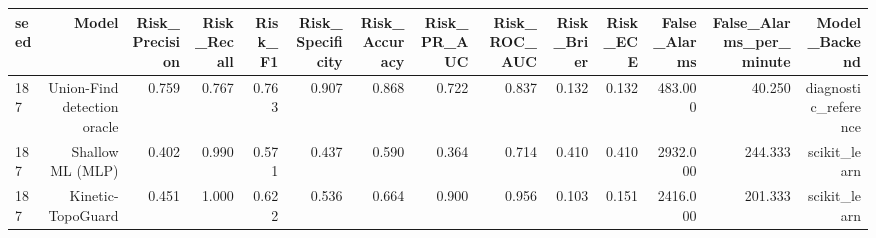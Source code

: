 \begin{tabular}{lrrrrrrrrrrrrr}
\toprule
seed & Model & Risk\_Precision & Risk\_Recall & Risk\_F1 & Risk\_Specificity & Risk\_Accuracy & Risk\_PR\_AUC & Risk\_ROC\_AUC & Risk\_Brier & Risk\_ECE & False\_Alarms & False\_Alarms\_per\_minute & Model\_Backend \\
\midrule
187 & Union-Find detection oracle & 0.759 & 0.767 & 0.763 & 0.907 & 0.868 & 0.722 & 0.837 & 0.132 & 0.132 & 483.000 & 40.250 & diagnostic\_reference \\
187 & Shallow ML (MLP) & 0.402 & 0.990 & 0.571 & 0.437 & 0.590 & 0.364 & 0.714 & 0.410 & 0.410 & 2932.000 & 244.333 & scikit\_learn \\
187 & Kinetic-TopoGuard & 0.451 & 1.000 & 0.622 & 0.536 & 0.664 & 0.900 & 0.956 & 0.103 & 0.151 & 2416.000 & 201.333 & scikit\_learn \\
\bottomrule
\end{tabular}